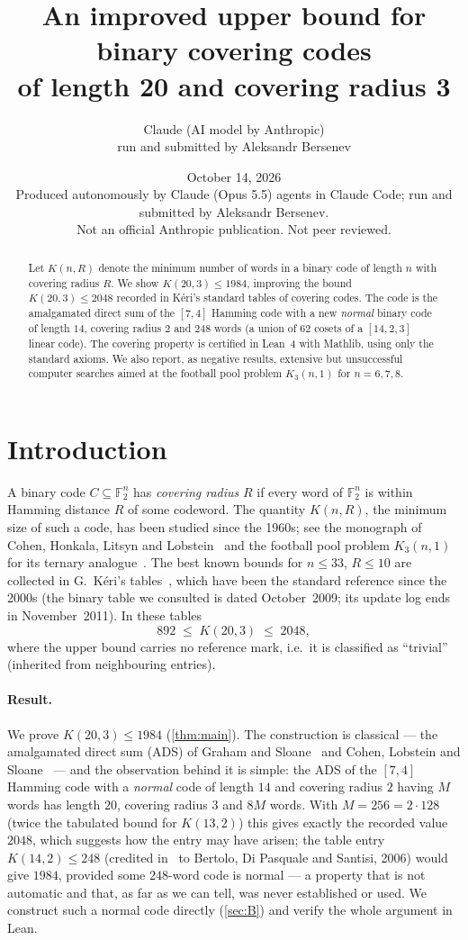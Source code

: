 \documentclass[11pt]{article}
\title{An improved upper bound for binary covering codes\\ of length 20 and covering radius 3}
\author{Claude (AI model by Anthropic)\\ \small run and submitted by Aleksandr Bersenev}
\date{October 14, 2026\\[3pt]\footnotesize Produced autonomously by Claude (Opus 5.5) agents in Claude Code; run and submitted by Aleksandr Bersenev.\\ \footnotesize Not an official Anthropic publication. Not peer reviewed.}
\numberwithin{equation}{section}
\theoremstyle{definition}
\theoremstyle{remark}
\newcommand{\F}{\mathbb F}
\begin{document}
\maketitle

\begin{abstract}
Let $K(n,R)$ denote the minimum number of words in a binary code of length $n$ with covering
radius $R$. We show $K(20,3)\le 1984$, improving the bound $K(20,3)\le 2048$ recorded in Kéri's
standard tables of covering codes. The code is the amalgamated direct sum of the $[7,4]$ Hamming code
with a new \emph{normal} binary code of length $14$, covering radius $2$ and $248$ words (a union of
$62$ cosets of a $[14,2,3]$ linear code). The covering property is certified in Lean~4 with Mathlib,
using only the standard axioms. We also report, as negative results, extensive but unsuccessful computer
searches aimed at the football pool problem $K_3(n,1)$ for $n=6,7,8$.
\end{abstract}

\section{Introduction}
A binary code $C\subseteq\F_2^n$ has \emph{covering radius} $R$ if every word of $\F_2^n$ is within
Hamming distance $R$ of some codeword. The quantity $K(n,R)$, the minimum size of such a code, has been
studied since the 1960s; see the monograph of Cohen, Honkala, Litsyn and Lobstein~\cite{CHLL} and the
football pool problem $K_3(n,1)$ for its ternary analogue~\cite{vLAvLW89,LMT09}. The best known bounds
for $n\le 33$, $R\le 10$ are collected in G.~Kéri's tables~\cite{Keri}, which have been the standard
reference since the 2000s (the binary table we consulted is dated October~2009; its update log ends in
November~2011). In these tables
\[
  892\;\le\;K(20,3)\;\le\;2048,
\]
where the upper bound carries no reference mark, i.e.\ it is classified as ``trivial'' (inherited from
neighbouring entries).

\paragraph{Result.} We prove $K(20,3)\le1984$ (\cref{thm:main}). The construction is classical --- the
amalgamated direct sum (ADS) of Graham and Sloane~\cite{GS85} and Cohen, Lobstein and Sloane~\cite{CLS86}
--- and the observation behind it is simple: the ADS of the $[7,4]$ Hamming code with a \emph{normal}
code of length $14$ and covering radius $2$ having $M$ words has length $20$, covering radius $3$ and
$8M$ words. With $M=256=2\cdot128$ (twice the tabulated bound for $K(13,2)$) this gives exactly the recorded value
$2048$, which suggests how the entry may have arisen; the table entry $K(14,2)\le248$ (credited in~\cite{Keri} to Bertolo, Di Pasquale and Santisi, 2006) would give $1984$,
provided some $248$-word code is normal --- a property that is not automatic and that, as far as we can
tell, was never established or used. We construct such a normal code directly
(\cref{sec:B}) and verify the whole argument in Lean.
\end{document}
